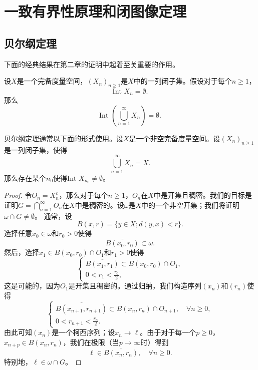 \chapter{一致有界性原理和闭图像定理}

\section{贝尔纲定理}

下面的经典结果在第二章的证明中起着至关重要的作用。

\begin{theorem}[贝尔]\label{theorem2.1}
设$X$是一个完备度量空间，$(X_n)_{n \geq 1}$是$X$中的一列闭子集。假设对于每个$n \geq 1$，
\[
\text{Int } X_n = \emptyset.
\]
那么
\[
\text{Int } \left(\bigcup_{n=1}^\infty X_n\right) = \emptyset.
\]
\end{theorem}

\begin{remark}
贝尔纲定理通常以下面的形式使用。设$X$是一个非空完备度量空间。设$(X_n)_{n \geq 1}$是一列闭子集，使得
\[
\bigcup_{n=1}^\infty X_n = X.
\]
那么存在某个$n_0$使得$\text{Int } X_{n_0} \neq \emptyset$。
\end{remark}

\begin{proof}
令$O_n = X_n^c$，那么对于每个$n \geq 1$，$O_n$在$X$中是开集且稠密。我们的目标是证明$G = \bigcap_{n=1}^\infty O_n$在$X$中是稠密的。设$\omega$是$X$中的一个非空开集；我们将证明$\omega \cap G \neq \emptyset$。
通常，设
\[
B(x, r) = \{y \in X; d(y, x) < r\}.
\]
选择任意$x_0 \in \omega$和$r_0 > 0$使得
\[
\overline{B(x_0, r_0)} \subset \omega.
\]
然后，选择$x_1 \in B(x_0, r_0) \cap O_1$和$r_1 > 0$使得
\[
\begin{cases}
\overline{B(x_1, r_1)} \subset B(x_0, r_0) \cap O_1, \\
0 < r_1 < \frac{r_0}{2},
\end{cases}
\]
这是可能的，因为$O_1$是开集且稠密的。通过归纳，我们构造序列$(x_n)$和$(r_n)$使得
\[
\begin{cases}
\overline{B(x_{n+1}, r_{n+1})} \subset B(x_n, r_n) \cap O_{n+1}, \quad \forall n \geq 0, \\
0 < r_{n+1} < \frac{r_n}{2}.
\end{cases}
\]
由此可知$(x_n)$是一个柯西序列；设$x_n \to \ell$。由于对于每一个$p \geq 0$，$x_{n+p} \in B(x_n, r_n)$，我们在极限（当$p \to \infty$时）得到
\[
\ell \in \overline{B(x_n, r_n)}, \quad \forall n \geq 0.
\]
特别地，$\ell \in \omega \cap G$。
\end{proof}

